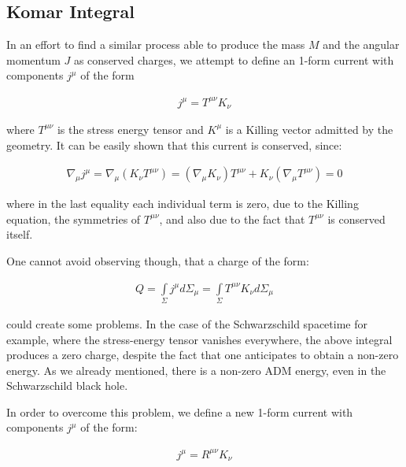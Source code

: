 \documentclass[a4paper,notitlepage]{report}
\begin{document}
\subsection{Komar Integral}
 
In an effort to find a similar process able to produce the mass $M$ and the angular momentum $J$ as conserved charges, we attempt to define an 1-form current with components $j^\mu$ of the form \cite{carroll2004spacetime,townsend1997black}

\begin{align}
j^\mu = T^{\mu\nu} K_\nu 
\end{align}

\vspace{0.5 em}
where $T^{\mu\nu}$ is the stress energy tensor and $K^\mu$ is a Killing vector admitted by the geometry. It can be easily shown that this current is conserved, since:

\begin{align}
\nabla_\mu j^\mu = \nabla_\mu (K_\nu T^{\mu\nu}) = (\nabla_\mu K_\nu) T^{\mu\nu} + K_\nu (\nabla_\mu T^{\mu\nu}) = 0 
\end{align}

\vspace{0.5 em}
where in the last equality each individual term is zero, due to the Killing equation, the symmetries of $T^{\mu\nu}$, and also due to the fact that $T^{\mu\nu}$ is conserved itself.

One cannot avoid observing though, that a charge of the form:

\begin{align}
Q = \int\limits_{\Sigma} j^\mu d\Sigma_\mu = \int\limits_{\Sigma} T^{\mu\nu} K_\nu  d\Sigma_\mu
\end{align}

\vspace{0.5 em}
could create some problems. In the case of the Schwarzschild spacetime for example, where the stress-energy tensor vanishes everywhere, the above integral produces a zero charge, despite the fact that one anticipates to obtain a non-zero energy. As we already mentioned, there is a non-zero ADM energy, even in the Schwarzschild black hole. 

In order to overcome this problem, we define a new 1-form current with components $j^\mu$ of the form:

\begin{align} \label{C}
j^\mu = R^{\mu\nu} K_\nu 
\end{align}
\end{document}
